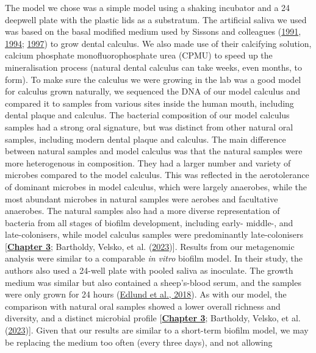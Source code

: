 \documentclass[
  letterpaper,
]{book}
\begin{document}
The model we chose was a simple model using a shaking incubator and a 24
deepwell plate with the plastic lids as a substratum. The artificial
saliva we used was based on the basal modified medium used by Sissons
and colleagues
(\protect\hyperlink{ref-sissonsMultistationPlaque1991}{1991},
\protect\hyperlink{ref-sissonsPHResponse1994}{1994};
\protect\hyperlink{ref-sissonsArtificialPlaque1997}{1997}) to grow
dental calculus. We also made use of their calcifying solution, calcium
phosphate monofluorophosphate urea (CPMU) to speed up the mineralisation
process (natural dental calculus can take weeks, even months, to form).
To make sure the calculus we were growing in the lab was a good model
for calculus grown naturally, we sequenced the DNA of our model calculus
and compared it to samples from various sites inside the human mouth,
including dental plaque and calculus. The bacterial composition of our
model calculus samples had a strong oral signature, but was distinct
from other natural oral samples, including modern dental plaque and
calculus. The main difference between natural samples and model calculus
was that the natural samples were more heterogenous in composition. They
had a larger number and variety of microbes compared to the model
calculus. This was reflected in the aerotolerance of dominant microbes
in model calculus, which were largely anaerobes, while the most abundant
microbes in natural samples were aerobes and facultative anaerobes. The
natural samples also had a more diverse representation of bacteria from
all stages of biofilm development, including early- middle-, and
late-colonisers, while model calculus samples were predominantly
late-colonisers {[}\protect\hyperlink{byoc-valid}{\textbf{Chapter 3}};
Bartholdy, Velsko, et al.
(\protect\hyperlink{ref-bartholdyAssessingValidity2023}{2023}){]}.
Results from our metagenomic analysis were similar to a comparable
\emph{in vitro} biofilm model. In their study, the authors also used a
24-well plate with pooled saliva as inoculate. The growth medium was
similar but also contained a sheep's-blood serum, and the samples were
only grown for 24 hours
(\protect\hyperlink{ref-edlundUncoveringComplex2018}{Edlund et al.,
2018}). As with our model, the comparison with natural oral samples
showed a lower overall richness and diversity, and a distinct microbial
profile {[}\protect\hyperlink{byoc-valid}{\textbf{Chapter 3}};
Bartholdy, Velsko, et al.
(\protect\hyperlink{ref-bartholdyAssessingValidity2023}{2023}){]}. Given
that our results are similar to a short-term biofilm model, we may be
replacing the medium too often (every three days), and not allowing
\end{document}
